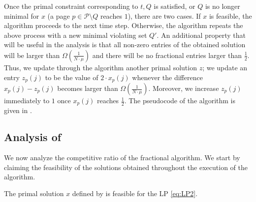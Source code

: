 \documentclass[11pt]{article}
\newcommand{\cP}{{\mathcal{P}}}
\begin{document}
Once the primal constraint corresponding to $t,Q$ is satisfied, or $Q$ is no longer minimal for $x$ (a page $p \in \cP \setminus Q$ reaches $1$), there are two cases. If $x$ is feasible, the algorithm proceeds to the next time step. Otherwise, the algorithm repeats the above process with a new minimal violating set $Q'$. An additional property that will be useful in the analysis is that all non-zero entries of the obtained solution will be larger than $\Omega\left( \frac{1}{N \cdot \mu}\right)$ and there will be no fractional entries larger than $\frac{1}{2}$. Thus, we update through the algorithm another primal solution $z$; we update an entry $z_p(j)$ to be the value of $2 \cdot x_p(j)$ whenever the difference $x_p(j)-z_p(j)$ becomes larger than  $\Omega\left( \frac{1}{N \cdot \mu}\right)$. Moreover, we increase $z_p(j)$ %
immediately to $1$ once $x_p(j)$ reaches $\frac{1}{2}$. The pseudocode of the algorithm is given in . 

\subsection{Analysis of }

We now analyze the competitive ratio of the fractional algorithm. We start by claiming the feasibility of the solutions obtained throughout the execution of the algorithm. 

	\begin{lemma}
	\label{lem:primalX}
	The primal solution $x$ defined by 	 is feasible for the \textnormal{LP} \eqref{eq:LP2}. 
\end{lemma}
\end{document}
